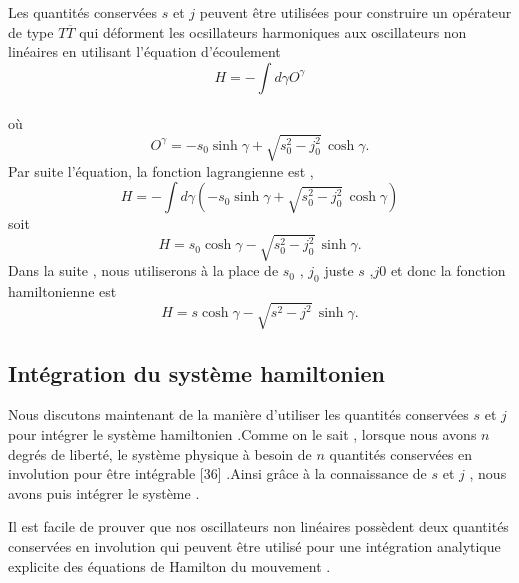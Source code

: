 \documentclass[12pt,a4paper, openany]{article}
\begin{document}
 Les quantités conservées $s$ et $j$ peuvent \^{e}tre utilisées pour construire un opérateur de type $T\overline{T}$ qui déforment les ocsillateurs harmoniques aux oscillateurs non linéaires en utilisant l'équation d'écoulement
 $$H=-\int d{\gamma}O^{\gamma} $$\\
 où 
 \begin{equation}
 O^{\gamma}=-s_0\sinh{\gamma} +	\sqrt{s^2_0-j_0^2}\,\cosh{\gamma}.
 \end{equation}
 Par suite l'équation, la fonction lagrangienne est ,
 \begin{equation}
 	H=-\int d{\gamma\left(-s_0\sinh{\gamma} +\sqrt{s^2_0-j_0^2}\,\cosh{\gamma}\right)}
 \end{equation}
 soit 
 \begin{equation}
 	H=s_0\cosh{\gamma}-\sqrt{s^2_0-j_0^2}\,\sinh{\gamma} .
 \end{equation}
 Dans la suite , nous utiliserons à la place de $s_0$ , $j_0$ juste $s$ ,$j0$ et donc la fonction hamiltonienne est 
 \begin{equation}
 	H=s\cosh{\gamma}-\sqrt{s^2-j^2}\,\sinh{\gamma} .
 \end{equation}
 \subsection{Intégration du système hamiltonien}
 
 \hspace{0.5cm}Nous discutons maintenant de la manière d'utiliser les quantités conservées $s$ et $j$ pour intégrer le système hamiltonien .Comme on le sait , lorsque nous avons $n$ degrés de liberté, le système physique à besoin de $n$ quantités conservées en involution pour \^{e}tre intégrable [36] .Ainsi gr\^{a}ce à la connaissance de $s$ et $j$ , nous avons puis intégrer le système .
 
 Il est facile de prouver que nos oscillateurs non linéaires possèdent deux quantités conservées en involution qui peuvent \^{e}tre utilisé pour une intégration analytique explicite des équations de Hamilton du mouvement .
 
\end{document}
